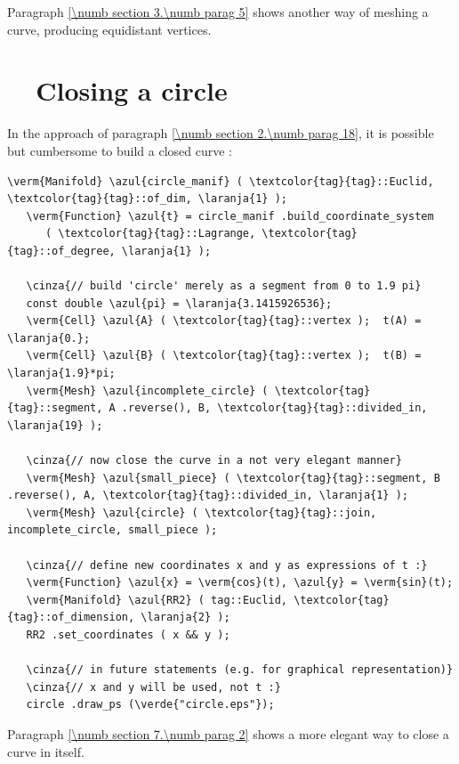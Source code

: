 Paragraph \ref{\numb section 3.\numb parag 5} shows another way of meshing a curve,
producing equidistant vertices.


\section{~~Closing a circle}\label{\numb section 2.\numb parag 19}

In the approach of paragraph \ref{\numb section 2.\numb parag 18}, it is possible but cumbersome to
build a closed curve :

\begin{Verbatim}[commandchars=\\\{\},formatcom=\small\tt,frame=single,
   label=parag-\ref{\numb section 2.\numb parag 19}.cpp,rulecolor=\color{moldura},
   baselinestretch=0.94,framesep=2mm]
   \verm{Manifold} \azul{circle_manif} ( \textcolor{tag}{tag}::Euclid, \textcolor{tag}{tag}::of_dim, \laranja{1} );
   \verm{Function} \azul{t} = circle_manif .build_coordinate_system
      ( \textcolor{tag}{tag}::Lagrange, \textcolor{tag}{tag}::of_degree, \laranja{1} );

   \cinza{// build 'circle' merely as a segment from 0 to 1.9 pi}
   const double \azul{pi} = \laranja{3.1415926536};
   \verm{Cell} \azul{A} ( \textcolor{tag}{tag}::vertex );  t(A) =  \laranja{0.};
   \verm{Cell} \azul{B} ( \textcolor{tag}{tag}::vertex );  t(B) =  \laranja{1.9}*pi;
   \verm{Mesh} \azul{incomplete_circle} ( \textcolor{tag}{tag}::segment, A .reverse(), B, \textcolor{tag}{tag}::divided_in, \laranja{19} );

   \cinza{// now close the curve in a not very elegant manner}
   \verm{Mesh} \azul{small_piece} ( \textcolor{tag}{tag}::segment, B .reverse(), A, \textcolor{tag}{tag}::divided_in, \laranja{1} );
   \verm{Mesh} \azul{circle} ( \textcolor{tag}{tag}::join, incomplete_circle, small_piece );

   \cinza{// define new coordinates x and y as expressions of t :}
   \verm{Function} \azul{x} = \verm{cos}(t), \azul{y} = \verm{sin}(t);
   \verm{Manifold} \azul{RR2} ( tag::Euclid, \textcolor{tag}{tag}::of_dimension, \laranja{2} );
   RR2 .set_coordinates ( x && y );

   \cinza{// in future statements (e.g. for graphical representation)}
   \cinza{// x and y will be used, not t :}
   circle .draw_ps (\verde{"circle.eps"});
\end{Verbatim}

Paragraph \ref{\numb section 7.\numb parag 2} shows a more elegant way to close a curve in itself.

